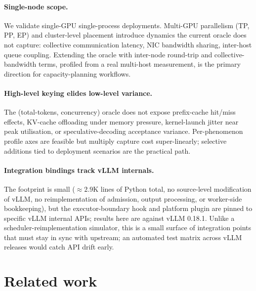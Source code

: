 \documentclass[conference]{IEEEtran}
\begin{document}
\paragraph{Single-node scope.} We validate single-GPU
single-process deployments. Multi-GPU parallelism (TP, PP, EP)
and cluster-level placement introduce dynamics the current
oracle does not capture: collective communication latency, NIC
bandwidth sharing, inter-host queue coupling. Extending the
oracle with inter-node round-trip and collective-bandwidth
terms, profiled from a real multi-host measurement, is the
primary direction for capacity-planning workflows.

\paragraph{High-level keying elides low-level variance.} The
(total-tokens, concurrency) oracle does not expose prefix-cache
hit/miss effects, KV-cache offloading under memory pressure,
kernel-launch jitter near peak utilisation, or
speculative-decoding acceptance variance. Per-phenomenon profile
axes are feasible but multiply capture cost super-linearly;
selective additions tied to deployment scenarios are the
practical path.

\paragraph{Integration bindings track vLLM internals.} The
footprint is small (${\approx}2.9$K lines of Python total, no
source-level modification of vLLM, no reimplementation of
admission, output processing, or worker-side bookkeeping), but
the executor-boundary hook and platform plugin are pinned to
specific vLLM internal APIs; results here are against vLLM
0.18.1. Unlike a scheduler-reimplementation simulator, this is a
small surface of integration points that must stay in sync with
upstream; an automated test matrix across vLLM releases would
catch API drift early.

\section{Related work}
\label{sec:related}
\end{document}

